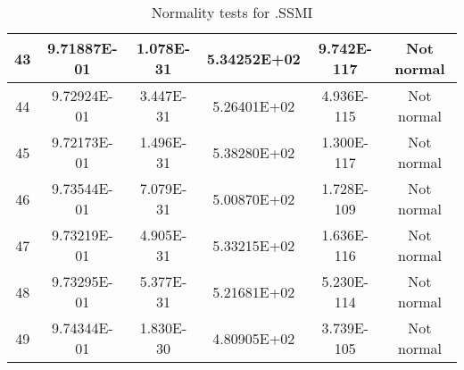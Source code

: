 \begin{table}[h]
\begin{tabular}{|c|c|c|c|c|c|}
		43 & 9.71887E-01 & 1.078E-31 & 5.34252E+02 & 9.742E-117 & Not normal\\\hline
		44 & 9.72924E-01 & 3.447E-31 & 5.26401E+02 & 4.936E-115 & Not normal\\\hline
		45 & 9.72173E-01 & 1.496E-31 & 5.38280E+02 & 1.300E-117 & Not normal\\\hline
		46 & 9.73544E-01 & 7.079E-31 & 5.00870E+02 & 1.728E-109 & Not normal\\\hline
		47 & 9.73219E-01 & 4.905E-31 & 5.33215E+02 & 1.636E-116 & Not normal\\\hline
		48 & 9.73295E-01 & 5.377E-31 & 5.21681E+02 & 5.230E-114 & Not normal\\\hline
		49 & 9.74344E-01 & 1.830E-30 & 4.80905E+02 & 3.739E-105 & Not normal\\\hline
	\end{tabular}
	\caption{Normality tests for .SSMI}
	\label{tab:normality_tests_SSMI}
\end{table}

